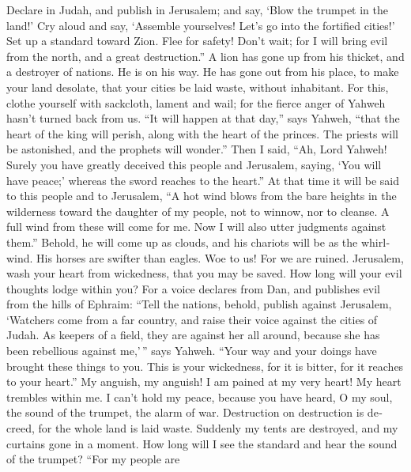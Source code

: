 \begin{paracol}{2}
\begin{otherlanguage}{english}
 Declare in Judah, and publish in Jerusalem; and say,
`Blow the trumpet in the land!' Cry aloud and say, `Assemble yourselves!
Let's go into the fortified cities!'  Set up a standard
toward Zion. Flee for safety! Don't wait; for I will bring evil from the
north, and a great destruction.''  A lion has gone up from
his thicket, and a destroyer of nations. He is on his way. He has gone
out from his place, to make your land desolate, that your cities be laid
waste, without inhabitant.  For this, clothe yourself with
sackcloth, lament and wail; for the fierce anger of Yahweh hasn't turned
back from us.  ``It will happen at that day,'' says
Yahweh, ``that the heart of the king will perish, along with the heart
of the princes. The priests will be astonished, and the prophets will
wonder.''  Then I said, ``Ah, Lord Yahweh! Surely you
have greatly deceived this people and Jerusalem, saying, `You will have
peace;' whereas the sword reaches to the heart.''  At
that time it will be said to this people and to Jerusalem, ``A hot wind
blows from the bare heights in the wilderness toward the daughter of my
people, not to winnow, nor to cleanse.  A full wind from
these will come for me. Now I will also utter judgments against them.''
 Behold, he will come up as clouds, and his chariots will
be as the whirlwind. His horses are swifter than eagles. Woe to us! For
we are ruined.  Jerusalem, wash your heart from
wickedness, that you may be saved. How long will your evil thoughts
lodge within you?  For a voice declares from Dan, and
publishes evil from the hills of Ephraim:  ``Tell the
nations, behold, publish against Jerusalem, `Watchers come from a far
country, and raise their voice against the cities of Judah.
 As keepers of a field, they are against her all around,
because she has been rebellious against me,'\,'' says Yahweh.
 ``Your way and your doings have brought these things to
you. This is your wickedness, for it is bitter, for it reaches to your
heart.''  My anguish, my anguish! I am pained at my very
heart! My heart trembles within me. I can't hold my peace, because you
have heard, O my soul, the sound of the trumpet, the alarm of war.
 Destruction on destruction is decreed, for the whole
land is laid waste. Suddenly my tents are destroyed, and my curtains
gone in a moment.  How long will I see the standard and
hear the sound of the trumpet?  ``For my people are

\end{otherlanguage}
\end{paracol}
